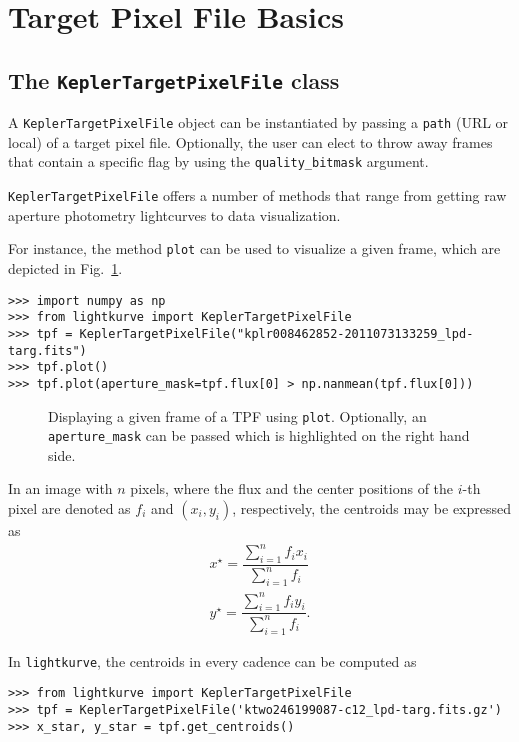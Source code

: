 \documentclass[twocolumn]{aastex62}
\begin{document}
\section{Target Pixel File Basics}
    \subsection{The \texttt{KeplerTargetPixelFile} class}
        A \texttt{KeplerTargetPixelFile} object can be instantiated
        by passing a \texttt{path} (URL or local) of a target pixel file.
        Optionally, the user can elect to throw away frames that contain
        a specific flag by using the \texttt{quality\_bitmask} argument.

        \texttt{KeplerTargetPixelFile} offers a number of methods
        that range from getting raw aperture photometry lightcurves to
        data visualization.

        For instance, the method \texttt{plot} can be used to visualize a
        given frame, which are depicted in Fig.~\ref{fig:plot-method}.
\begin{verbatim}
>>> import numpy as np
>>> from lightkurve import KeplerTargetPixelFile
>>> tpf = KeplerTargetPixelFile("kplr008462852-2011073133259_lpd-targ.fits")
>>> tpf.plot()
>>> tpf.plot(aperture_mask=tpf.flux[0] > np.nanmean(tpf.flux[0]))
\end{verbatim}

\begin{figure}[!htb]
    \centering
    \caption{Displaying a given frame of a TPF using \texttt{plot}.
    Optionally, an \texttt{aperture\_mask} can be passed which is
    highlighted on the right hand side.}
    \label{fig:plot-method}
\end{figure}

In an image with $n$ pixels, where the flux and the center positions of the
$i$-th pixel are denoted as $f_i$ and $(x_i, y_i)$, respectively, the centroids
may be expressed as
\begin{align}
    x^{\star} = \dfrac{\sum_{i=1}^{n} f_i x_i}{\sum_{i=1}^{n}f_i} \\
    y^{\star} = \dfrac{\sum_{i=1}^{n} f_i y_i}{\sum_{i=1}^{n}f_i}.
\end{align}

In \texttt{lightkurve}, the centroids in every cadence can be computed as
\begin{verbatim}
>>> from lightkurve import KeplerTargetPixelFile
>>> tpf = KeplerTargetPixelFile('ktwo246199087-c12_lpd-targ.fits.gz')
>>> x_star, y_star = tpf.get_centroids()
\end{verbatim}
\end{document}
